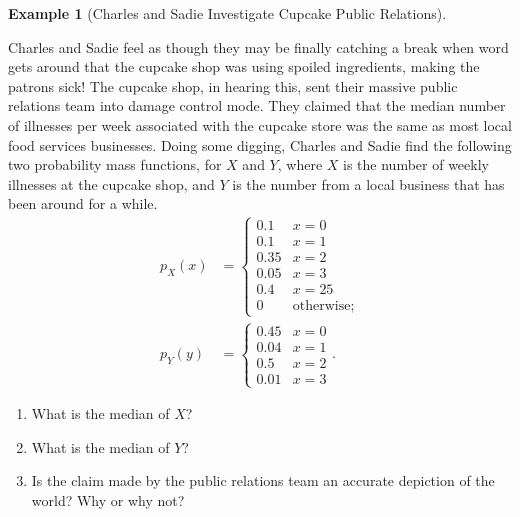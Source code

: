 \documentclass[
  letterpaper,
  DIV=11,
  numbers=noendperiod]{scrreprt}
\providecommand{\tightlist}{%
  \setlength{\itemsep}{0pt}\setlength{\parskip}{0pt}}\usepackage{longtable,booktabs,array}
\theoremstyle{definition}
\theoremstyle{definition}
\newtheorem{example}{Example}[chapter]
\theoremstyle{definition}
\theoremstyle{remark}
\begin{document}
\begin{example}[Charles and Sadie Investigate Cupcake Public
Relations]\protect\hypertarget{exm-median-two}{}\label{exm-median-two}

Charles and Sadie feel as though they may be finally catching a break
when word gets around that the cupcake shop was using spoiled
ingredients, making the patrons sick! The cupcake shop, in hearing this,
sent their massive public relations team into damage control mode. They
claimed that the median number of illnesses per week associated with the
cupcake store was the same as most local food services businesses. Doing
some digging, Charles and Sadie find the following two probability mass
functions, for \(X\) and \(Y\), where \(X\) is the number of weekly
illnesses at the cupcake shop, and \(Y\) is the number from a local
business that has been around for a while. \begin{align*}
p_X(x) &= \begin{cases}
    0.1 & x = 0 \\ 
    0.1 & x = 1 \\
    0.35 & x = 2 \\
    0.05 & x = 3 \\ 
    0.4 & x = 25 \\
    0 & \text{otherwise};
\end{cases} \\
p_Y(y) &= \begin{cases}
    0.45 & x = 0 \\
    0.04 & x = 1 \\
    0.5 & x = 2 \\
    0.01 & x = 3
\end{cases}.
\end{align*}

\begin{enumerate}
\def\labelenumi{\alph{enumi}.}
\tightlist
\item
  What is the median of \(X\)?
\item
  What is the median of \(Y\)?
\item
  Is the claim made by the public relations team an accurate depiction
  of the world? Why or why not?
\end{enumerate}

\begin{tcolorbox}[enhanced jigsaw, colback=white, colframe=quarto-callout-color-frame, arc=.35mm, leftrule=.75mm, rightrule=.15mm, opacityback=0, breakable, bottomrule=.15mm, left=2mm, toprule=.15mm]


\end{tcolorbox}
\end{example}
\end{document}

